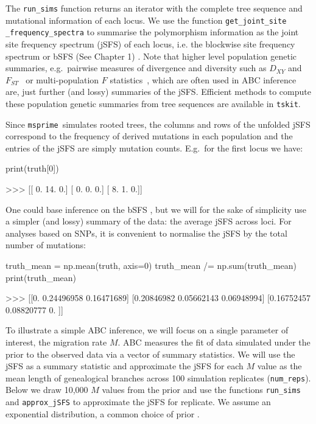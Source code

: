 \documentclass[graybox]{svmult}
\newcommand{\msprime}[0]{\texttt{msprime}}
\newcommand{\tskit}[0]{\texttt{tskit}}
\begin{document}
    The \texttt{run\_sims} function returns an iterator with the complete
tree sequence and mutational information of each locus. We use the
function \texttt{get\_joint\_site} \texttt{\_frequency\_spectra} to summarise the
polymorphism information as the joint site frequency spectrum (jSFS) of
each locus, i.e. the blockwise site frequency spectrum
or bSFS (See Chapter 1) \cite[sensu][]{Lohse2016}.
Note that higher level population genetic summaries, e.g.\ pairwise
measures of divergence and diversity such as \(D_{XY}\) \citep{Nei1972} and
\(F_{ST}\)~\citep{wright1950genetical} or multi-population \(F\)
statistics~\citep{Durand2009,patterson2012ancient}, which are often
used in ABC inference are, just further (and lossy) summaries of the jSFS.
Efficient methods to compute these population genetic summaries from tree sequences
are available in \tskit.

Since \msprime\ simulates rooted trees, the columns and rows
of the unfolded jSFS correspond to the frequency of derived mutations in
each population and the entries of the jSFS are simply mutation counts.
E.g.\ for the first locus we have:
\begin{pythoncode}
print(truth[0])

>>> [[ 0.  14.  0.]
     [ 0.  0.  0.]
     [ 8.  1.  0.]]
\end{pythoncode}

One could base inference on the bSFS \citep{Lohse2016, Beeravolu2017, HahnMishr2025},%
but we will for the sake of simplicity use a simpler (and lossy)
summary of the data: the average jSFS across loci. For analyses based on
SNPs, it is convenient to normalise the jSFS by the total number of
mutations:
\begin{pythoncode}
truth_mean = np.mean(truth, axis=0)
truth_mean /= np.sum(truth_mean)
print(truth_mean)

>>> [[0.         0.24496958 0.16471689]
     [0.20846982 0.05662143 0.06948994]
     [0.16752457 0.08820777 0.        ]]
\end{pythoncode}

    To illustrate a simple ABC inference, we will focus on a single
parameter of interest, the migration rate \(M\).
ABC measures the fit of data simulated under the prior to the observed
data via a vector of summary statistics. We will use the jSFS as a
summary statistic and approximate the jSFS for each \(M\) value as the
mean length of genealogical branches across 100 simulation replicates (\texttt{num\_reps}). Below we
draw 10,000 \(M\) values from the prior and use the functions
\texttt{run\_sims} and \texttt{approx\_jSFS} to approximate the jSFS for
 replicate. We assume an exponential distribution, a common choice of prior \citep{hey2004multilocus}.
\end{document}
